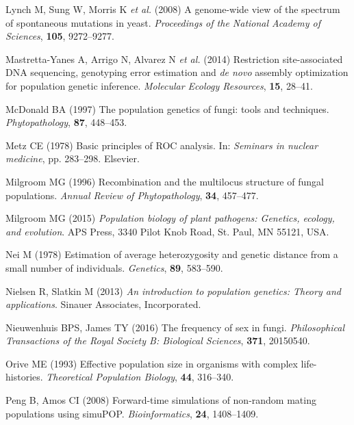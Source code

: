 \documentclass[]{article}
\theoremstyle{definition}
\theoremstyle{definition}
\theoremstyle{definition}
\theoremstyle{remark}
\begin{document}
\hypertarget{ref-lynch2008genome}{}
Lynch M, Sung W, Morris K \emph{et al.} (2008) A genome-wide view of the
spectrum of spontaneous mutations in yeast. \emph{Proceedings of the
National Academy of Sciences}, \textbf{105}, 9272--9277.

\hypertarget{ref-mastretta2015restriction}{}
Mastretta-Yanes A, Arrigo N, Alvarez N \emph{et al.} (2014) Restriction
site-associated DNA sequencing, genotyping error estimation and \emph{de
novo} assembly optimization for population genetic inference.
\emph{Molecular Ecology Resources}, \textbf{15}, 28--41.

\hypertarget{ref-mcdonald1997population}{}
McDonald BA (1997) The population genetics of fungi: tools and
techniques. \emph{Phytopathology}, \textbf{87}, 448--453.

\hypertarget{ref-metz1978basic}{}
Metz CE (1978) Basic principles of ROC analysis. In: \emph{Seminars in
nuclear medicine}, pp. 283--298. Elsevier.

\hypertarget{ref-milgroom1996recombination}{}
Milgroom MG (1996) Recombination and the multilocus structure of fungal
populations. \emph{Annual Review of Phytopathology}, \textbf{34},
457--477.

\hypertarget{ref-milgroom2015population}{}
Milgroom MG (2015) \emph{Population biology of plant pathogens:
Genetics, ecology, and evolution}. APS Press, 3340 Pilot Knob Road, St.
Paul, MN 55121, USA.

\hypertarget{ref-Nei:1978}{}
Nei M (1978) Estimation of average heterozygosity and genetic distance
from a small number of individuals. \emph{Genetics}, \textbf{89},
583--590.

\hypertarget{ref-nielsen2013introduction}{}
Nielsen R, Slatkin M (2013) \emph{An introduction to population
genetics: Theory and applications}. Sinauer Associates, Incorporated.

\hypertarget{ref-nieuwenhuis2016frequency}{}
Nieuwenhuis BPS, James TY (2016) The frequency of sex in fungi.
\emph{Philosophical Transactions of the Royal Society B: Biological
Sciences}, \textbf{371}, 20150540.

\hypertarget{ref-orive1993effective}{}
Orive ME (1993) Effective population size in organisms with complex
life-histories. \emph{Theoretical Population Biology}, \textbf{44},
316--340.

\hypertarget{ref-peng2008forward}{}
Peng B, Amos CI (2008) Forward-time simulations of non-random mating
populations using simuPOP. \emph{Bioinformatics}, \textbf{24},
1408--1409.
\end{document}
